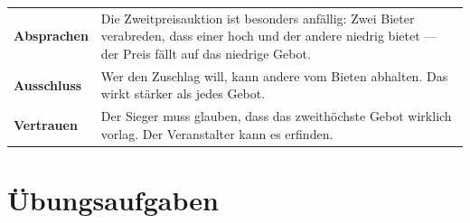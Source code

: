 \begin{warnung}
\begin{center}
{\small
\renewcommand{\arraystretch}{1.5}
\begin{tabular}{@{}P{2.4cm}P{6.2cm}@{}}
\toprule
\textbf{Absprachen} & Die Zweitpreisauktion ist besonders anfällig: Zwei Bieter verabreden, dass einer hoch und der andere niedrig bietet --- der Preis fällt auf das niedrige Gebot.\\
\textbf{Ausschluss} & Wer den Zuschlag will, kann andere vom Bieten abhalten. Das wirkt stärker als jedes Gebot.\\
\textbf{Vertrauen} & Der Sieger muss glauben, dass das zweithöchste Gebot wirklich vorlag. Der Veranstalter kann es erfinden.\\
\bottomrule
\end{tabular}}
\end{center}

\begin{center}
\begin{minipage}{0.88\textwidth}
\end{minipage}
\end{center}
\end{warnung}

\section{Übungsaufgaben}


